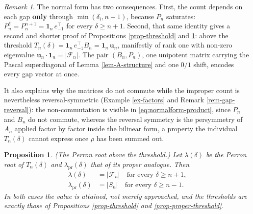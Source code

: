 \documentclass[11pt, a4paper, abstract=yes]{scrartcl}
\theoremstyle{definition}
\theoremstyle{remark}
\newtheorem{remark}[definition]{Remark}
\theoremstyle{plain}
\newtheorem{proposition}[definition]{Proposition}
\newcommand{\vek}[1]{\boldsymbol{#1}}
\begin{document}
\begin{remark}
The normal form has two consequences. First, the count depends on each gap \textbf{only} through
\(\min(\delta_i,n+1)\), because \(P_n\) saturates: \(P_n^{\delta}=P_n^{n+1}=\vek1_n\,e_{-1}^{\!\top}\) for
every \(\delta\ge n+1\). Second, that same identity gives a second and shorter proof of
Propositions \ref{prop-threshold} and \ref{prop-perron-threshold}: above the threshold
\(T_n(\delta)=\vek1_n\,e_{-1}^{\!\top}B_n=\vek1_n\,\vek u_n\), manifestly of rank one with non-zero eigenvalue
\(\vek u_n\cdot\vek1_n=\lvert\mathcal F_n\rvert\). The pair \((B_n,P_n)\), one unipotent
matrix carrying the Pascal superdiagonal of Lemma \ref{lem-A-structure} and one \(0/1\) shift, encodes
every gap vector at once.

It also explains why the matrices do not commute while the improper count is nevertheless
reversal-symmetric
(Example \ref{ex-factors} and Remark \ref{rem-gap-reversal}): the non-commutation is visible in
\eqref{eq:normalform-product}, since \(P_n\) and \(B_n\) do not commute, whereas the reversal symmetry is the
persymmetry of \(A_n\) applied factor by factor inside the bilinear form, a property the individual
\(T_n(\delta)\) cannot express once \(\rho\) has been summed out.
\label{rem-normalform}
\end{remark}

\begin{proposition}
(\emph{The Perron root above the threshold.}) Let \(\lambda(\delta)\) be the Perron root of \(T_n(\delta)\)
and \(\lambda_{\mathrm{pr}}(\delta)\) that of its proper analogue. Then
\begin{align}
  \lambda(\delta) &= \lvert\mathcal F_n\rvert \quad\text{for every }\delta\ge n+1,\label{eq:perron-threshold}\\
  \lambda_{\mathrm{pr}}(\delta) &= \lvert S_n\rvert \quad\text{for every }\delta\ge n-1 .\label{eq:perron-threshold-pr}
\end{align}
In both cases the value is attained, not merely approached, and the thresholds are exactly those of
Propositions \ref{prop-threshold} and \ref{prop-proper-threshold}.
\label{prop-perron-threshold}
\end{proposition}
\end{document}
